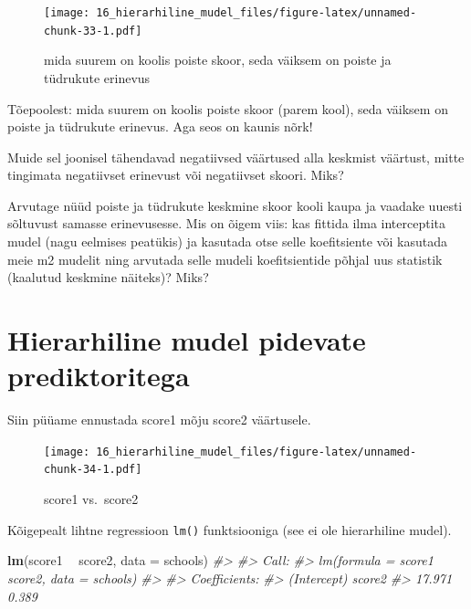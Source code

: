 \documentclass[]{book}
\newenvironment{Shaded}{\begin{snugshade}}{\end{snugshade}}
\newcommand{\CommentTok}[1]{\textcolor[rgb]{0.56,0.35,0.01}{\textit{#1}}}
\newcommand{\DataTypeTok}[1]{\textcolor[rgb]{0.13,0.29,0.53}{#1}}
\newcommand{\KeywordTok}[1]{\textcolor[rgb]{0.13,0.29,0.53}{\textbf{#1}}}
\newcommand{\NormalTok}[1]{#1}
\newcommand{\OperatorTok}[1]{\textcolor[rgb]{0.81,0.36,0.00}{\textbf{#1}}}
\newcommand{\StringTok}[1]{\textcolor[rgb]{0.31,0.60,0.02}{#1}}
\begin{document}
\begin{figure}
\centering
\texttt{[image: 16\_hierarhiline\_mudel\_files/figure-latex/unnamed-chunk-33-1.pdf]}
\caption{\label{fig:unnamed-chunk-33}mida suurem on koolis poiste skoor, seda väiksem on poiste ja tüdrukute erinevus}
\end{figure}

Tõepoolest: mida suurem on koolis poiste skoor (parem kool), seda väiksem on poiste ja tüdrukute erinevus. Aga seos on kaunis nõrk!

Muide sel joonisel tähendavad negatiivsed väärtused alla keskmist väärtust, mitte tingimata negatiivset erinevust või negatiivset skoori. Miks?

Arvutage nüüd poiste ja tüdrukute keskmine skoor kooli kaupa ja vaadake uuesti sõltuvust samasse erinevusesse. Mis on õigem viis: kas fittida ilma interceptita mudel (nagu eelmises peatükis) ja kasutada otse selle koefitsiente või kasutada meie m2 mudelit ning arvutada selle mudeli koefitsientide põhjal uus statistik (kaalutud keskmine näiteks)? Miks?

\hypertarget{hierarhiline-mudel-pidevate-prediktoritega}{%
\section{Hierarhiline mudel pidevate prediktoritega}\label{hierarhiline-mudel-pidevate-prediktoritega}}

Siin püüame ennustada score1 mõju score2 väärtusele.

\begin{Shaded}
\end{Shaded}

\begin{figure}
\centering
\texttt{[image: 16\_hierarhiline\_mudel\_files/figure-latex/unnamed-chunk-34-1.pdf]}
\caption{\label{fig:unnamed-chunk-34}score1 vs.~score2}
\end{figure}

Kõigepealt lihtne regressioon \texttt{lm()} funktsiooniga (see ei ole hierarhiline mudel).

\begin{Shaded}
\begin{Highlighting}[]
\KeywordTok{lm}\NormalTok{(score1 }\OperatorTok{~}\StringTok{ }\NormalTok{score2, }\DataTypeTok{data =}\NormalTok{ schools)}
\CommentTok{#> }
\CommentTok{#> Call:}
\CommentTok{#> lm(formula = score1 ~ score2, data = schools)}
\CommentTok{#> }
\CommentTok{#> Coefficients:}
\CommentTok{#> (Intercept)       score2  }
\CommentTok{#>      17.971        0.389}
\end{Highlighting}
\end{Shaded}
\end{document}
